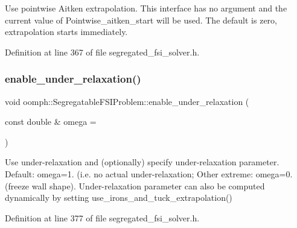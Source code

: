 Use pointwise Aitken extrapolation. This interface has no argument and the current value of Pointwise\+\_\+aitken\+\_\+start will be used. The default is zero, extrapolation starts immediately. 



Definition at line 367 of file segregated\+\_\+fsi\+\_\+solver.\+h.

\mbox{\label{classoomph_1_1SegregatableFSIProblem_a7ad67f163160a54024fb0bcd5fa531c3}} 
\subsubsection{\texorpdfstring{enable\+\_\+under\+\_\+relaxation()}{enable\_under\_relaxation()}}
{\footnotesize\ttfamily void oomph\+::\+Segregatable\+F\+S\+I\+Problem\+::enable\+\_\+under\+\_\+relaxation (\begin{DoxyParamCaption}\item[{const double \&}]{omega = {} }\end{DoxyParamCaption})\hspace{0.3cm}{\ttfamily [inline]}}



Use under-\/relaxation and (optionally) specify under-\/relaxation parameter. Default\+: omega=1. (i.\+e. no actual under-\/relaxation; Other extreme\+: omega=0. (freeze wall shape). Under-\/relaxation parameter can also be computed dynamically by setting use\+\_\+irons\+\_\+and\+\_\+tuck\+\_\+extrapolation() 



Definition at line 377 of file segregated\+\_\+fsi\+\_\+solver.\+h.

\mbox{\label{classoomph_1_1SegregatableFSIProblem_a0e67b39cdae35ea25ef97e5e768aa60a}} 
